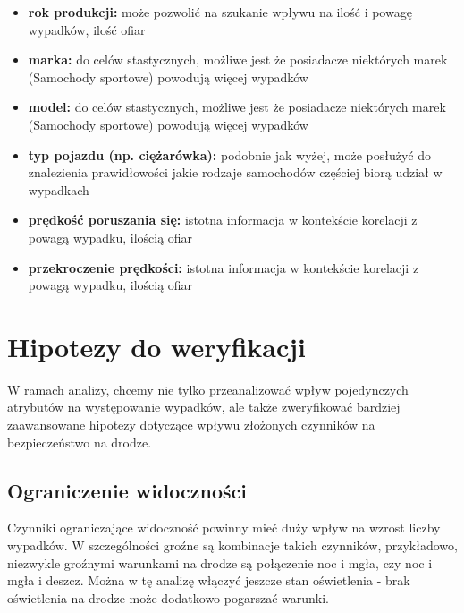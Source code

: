 \begin{itemize}
\itemsep-14pt\parskip0pt
\item
  \textbf{rok produkcji:} może pozwolić na szukanie wpływu na ilość i
  powagę wypadków, ilość ofiar\\
\item
  \textbf{marka:} do celów stastycznych, możliwe jest że posiadacze
  niektórych marek (Samochody sportowe) powodują więcej wypadków\\
\item
  \textbf{model:} do celów stastycznych, możliwe jest że posiadacze
  niektórych marek (Samochody sportowe) powodują więcej wypadków\\
\item
  \textbf{typ pojazdu (np. ciężarówka):} podobnie jak wyżej, może
  posłużyć do znalezienia prawidłowości jakie rodzaje samochodów
  częściej biorą udział w wypadkach\\
\item
  \textbf{prędkość poruszania się:} istotna informacja w kontekście
  korelacji z powagą wypadku, ilością ofiar\\
\item
  \textbf{przekroczenie prędkości:} istotna informacja w kontekście
  korelacji z powagą wypadku, ilością ofiar
\end{itemize}

\section{Hipotezy do weryfikacji}\label{hipotezy-do-weryfikacji}

W ramach analizy, chcemy nie tylko przeanalizować wpływ pojedynczych
atrybutów na występowanie wypadków, ale także zweryfikować bardziej
zaawansowane hipotezy dotyczące wpływu złożonych czynników na
bezpieczeństwo na drodze.

\subsection{Ograniczenie widoczności}\label{ograniczenie-widocznosci}

Czynniki ograniczające widoczność powinny mieć duży wpływ na wzrost
liczby wypadków. W szczególności groźne są kombinacje takich czynników,
przykładowo, niezwykle groźnymi warunkami na drodze są połączenie noc i
mgła, czy noc i mgła i deszcz. Można w tę analizę włączyć jeszcze stan
oświetlenia - brak oświetlenia na drodze może dodatkowo pogarszać
warunki.

